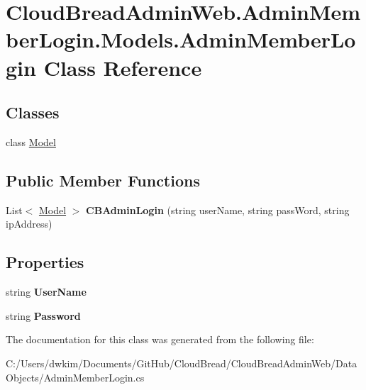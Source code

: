 \hypertarget{a00010}{}\section{Cloud\+Bread\+Admin\+Web.\+Admin\+Member\+Login.\+Models.\+Admin\+Member\+Login Class Reference}
\label{a00010}
\subsection*{Classes}
\begin{DoxyCompactItemize}
\item 
class \hyperlink{a00152}{Model}
\end{DoxyCompactItemize}
\subsection*{Public Member Functions}
\begin{DoxyCompactItemize}
\item 
List$<$ \hyperlink{a00152}{Model} $>$ {\bfseries C\+B\+Admin\+Login} (string user\+Name, string pass\+Word, string ip\+Address)\hypertarget{a00010_a63d8f50572b6c2bd5c6cd8514f3c696e}{}\label{a00010_a63d8f50572b6c2bd5c6cd8514f3c696e}

\end{DoxyCompactItemize}
\subsection*{Properties}
\begin{DoxyCompactItemize}
\item 
string {\bfseries User\+Name}\hypertarget{a00010_ad0d90ff54cd8ffc4270b7e093c3bddbd}{}\label{a00010_ad0d90ff54cd8ffc4270b7e093c3bddbd}

\item 
string {\bfseries Password}\hypertarget{a00010_a3604082f7c0c90e30d160d41797ca619}{}\label{a00010_a3604082f7c0c90e30d160d41797ca619}

\end{DoxyCompactItemize}


The documentation for this class was generated from the following file\+:\begin{DoxyCompactItemize}
\item 
C\+:/\+Users/dwkim/\+Documents/\+Git\+Hub/\+Cloud\+Bread/\+Cloud\+Bread\+Admin\+Web/\+Data\+Objects/Admin\+Member\+Login.\+cs\end{DoxyCompactItemize}
